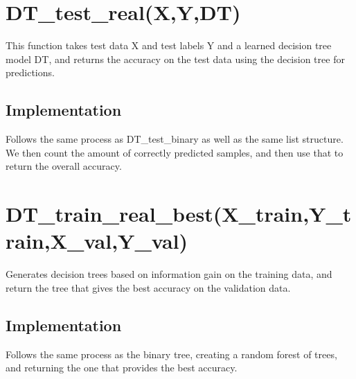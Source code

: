 \documentclass{article}
\begin{document}
\section{DT\_test\_real(X,Y,DT)}
This function takes test data X and test labels Y and a learned decision tree model DT, and returns the accuracy on
the test data using the decision tree for predictions. 
\subsection{Implementation}
Follows the same process as DT\_test\_binary as well as the same list structure. We then count the amount of correctly predicted samples, and then use that to return the overall accuracy.
\section{DT\_train\_real\_best(X\_train,Y\_train,X\_val,Y\_val)}
Generates decision trees based on information gain on the training data, and return the tree that gives the
best accuracy on the validation data.
\subsection{Implementation}
Follows the same process as the binary tree, creating a random forest of trees, and returning the one that provides the best accuracy. 
\end{document}
